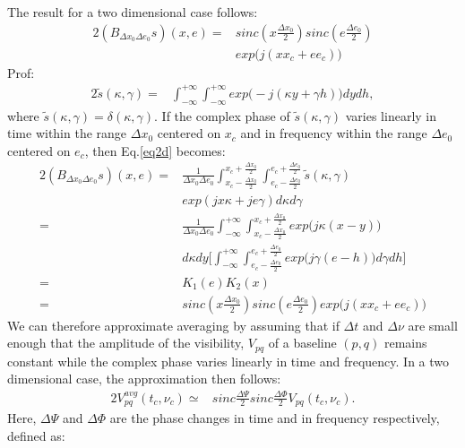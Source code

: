 The result for a two dimensional case follows:
\begin{alignat}{2}
(B_{\Delta x_0 \Delta e_0}s)(x,e)=&sinc (x\frac{\Delta x_0}{2})sinc(e\frac{\Delta e_0}{2})\\
				  &exp\big(j (xx_c+ee_c)\big)
\end{alignat}
Prof:
\begin{alignat}{2}
\tilde{s}(\kappa,\gamma) =& \int_{-\infty}^{+\infty}\int_{-\infty}^{+\infty}exp\big(-j(\kappa y+\gamma h)\big)dydh, \label{eq2d}
\end{alignat}
where $\tilde{s}(\kappa,\gamma)=\delta(\kappa,\gamma)$. If the complex phase of  $\tilde{s}(\kappa,\gamma)$ varies linearly in time within 
the range $\Delta x_0$ centered on  $x_c$ and in frequency within the range
$\Delta e_0$ centered on $e_c$, then Eq.\ref{eq2d} becomes:\\
\begin{alignat*}{2}
(B_{\Delta x_0\Delta e_0}s)(x,e) =& \frac{1}{\Delta x_0\Delta e_0}\int_{x_c-\frac{\Delta x_0}{2}}^{x_c+\frac{\Delta 
x_0}{2}}\int_{e_c-\frac{\Delta e_0}{2}}^{e_c+\frac{\Delta e_0}{2}}\tilde{s}(\kappa,\gamma)\\
				  &exp(jx\kappa+je\gamma)d\kappa d\gamma\\
		     =& \frac{1}{\Delta x_0 \Delta e_0}\int_{-\infty}^{+\infty}\int_{x_c-\frac{\Delta x_0}{2}}^{x_c+\frac{\Delta 
x_0}{2}}exp\big(j\kappa(x-y)\big)\\
		      &d\kappa dy \bigg[\int_{-\infty}^{+\infty}\int_{e_c-\frac{\Delta e_0}{2}}^{e_c+\frac{\Delta 
e_0}{2}}exp\big(j\gamma(e-h)\big)d\gamma dh\bigg]\\
		     =&K_1(e)K_2(x)\\
		     =&sinc (x\frac{\Delta x_0}{2})sinc(e\frac{\Delta e_0}{2})exp\big(j (xx_c+ee_c)\big)
\end{alignat*}
We can therefore approximate averaging   by assuming that if $\Delta t$ and $\Delta \nu$ are
small enough that the amplitude of the visibility, $V_{pq}$ of a baseline $(p,q)$ remains constant while
the complex phase varies linearly in time and frequency. In a two dimensional case, the approximation then follows:
\begin{alignat}{2}
 V_{pq}^{avg}(t_c, \nu_c)\simeq& sinc\frac{\Delta \Psi}{2}sinc\frac{\Delta \Phi}{2} V_{pq}(t_{c},\nu_{c})\label{eq:visibility}.
\end{alignat}
Here, $\Delta \Psi$ and $\Delta \Phi$ are the phase changes in time and in frequency respectively, defined as:
